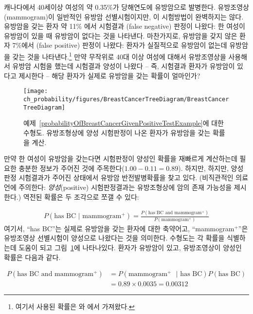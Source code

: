 \begin{example}{
캐나다에서 40세이상 여성의 약 0.35\%가 당해연도에 유방암으로 발병한다. 유방조영상(mammogram)이 일반적인 유방암 선별시험이지만, 이 시험방법이 완벽하지는 않다. 유방암을 갖는 환자 약 11\% 에서 시험결과 (false negative) 판정이 나왔다: 한 여성이 유방암이 있을 때 유방암이 없다는 것을 나타낸다. 마찬가지로, 유방암을 갖지 않은 환자 7\%에서 (false positive) 판정이 나왔다: 환자가 실질적으로 유방암이 없는데 유방암을 갖는 것을 나타낸다.\footnote{여기서 사용된 확률은  와 에서 가져왔다.} 만약 무작위로 40대 이상 여성에 대해서 유방조영상을 사용해서 유방암 시험을 했는데 시험결과 양성이 나왔다 -- 즉, 시험결과 환자가 유방암이 있다고 제시한다 -- 해당 환자가 실제로 유방암을 갖는 확률이 얼마인가?} 

\label{probabilityOfBreastCancerGivenPositiveTestExample}

\begin{figure}[h]
\centering
\texttt{[image: ch\_probability/figures/BreastCancerTreeDiagram/BreastCancerTreeDiagram]}
\caption{예제~\ref{probabilityOfBreastCancerGivenPositiveTestExample}에 대한 수형도. 유방조형상에 양성 시험판정이 나온 환자가 유방암을 갖는 확률을 계산.}
\label{BreastCancerTreeDiagram}
\end{figure}

만약 한 여성이 유방암을 갖는다면 시험판정이 양성인 확률을 재빠르게 계산하는데 필요한 충분한 정보가 주어진 것에 주목한다($1.00-0.11=0.89$). 하지만, 하지만, 양성판정 시험결과가 주어진 상태에서 유방암 반전발병확률을 찾고 있다. (비직관적인 의료 언에 주의한다: \emph{양성}(positive) 시험판정결과는 유방조형상에 암의 존재 가능성을 제시한다.) 역전된 확률은 두 조각으로 쪼갤 수 있다:

\begin{align*}
P(\text{has BC } | \text{ mammogram$^+$}) = \frac{P(\text{has BC and mammogram$^+$})}{P(\text{mammogram$^+$})}
\end{align*}
여기서, ``has BC''는 실제로 유방암을 갖는 환자에 대한 축약어고, ``mammogram$^+$''은 유방조영상 선별시험이 양성으로 나왔다는 것을 의미한다. 수형도는 각 확률을 식별하는데 도움이 되고 그림~\ref{BreastCancerTreeDiagram}에 나타나있다. 환자가 유방암이 있고, 유방조영상이 양성인 확률은 다음과 같다.

\begin{align*}
P(\text{has BC and mammogram$^+$}) &= P(\text{mammogram$^+$ } | \text{ has BC})P(\text{has BC}) \\
	&= 0.89\times 0.0035 = 0.00312
\end{align*}


\end{example}

